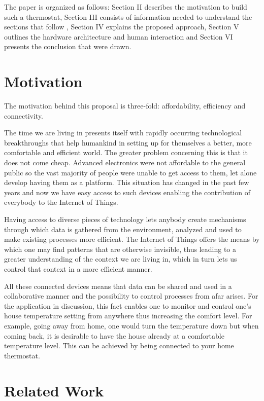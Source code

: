 \documentclass[conference]{IEEEtran}
\let\Oldsection\section
\renewcommand{\section}{\FloatBarrier\Oldsection}
\begin{document}
The paper is organized as follows: Section II describes the motivation to build such a thermostat, Section III
consists of information needed to understand the sections that follow , Section IV explains the proposed
approach, Section V outlines the hardware architecture and human interaction and Section VI presents the conclusion
that were drawn.

\section{Motivation}
\label{Motivation}

The motivation behind this proposal is three-fold: affordability, efficiency and connectivity.

The time we are living in presents itself with rapidly occurring technological breakthroughs that help
humankind in setting up for themselves a better, more comfortable and efficient world. The greater problem concerning
this is that it does not come cheap. Advanced electronics were not affordable to the general public so the vast
majority of people were unable to get access to them, let alone develop  having them as a platform. This
situation has changed in the past few years and now we have easy access to such devices enabling the
contribution of everybody to the Internet of Things.

Having access to diverse pieces of technology lets anybody create mechanisms through which data is gathered
from the environment, analyzed and used to make existing processes more efficient. The Internet of Things
offers the means by which one may find patterns that are otherwise invisible, thus leading to a greater
understanding of the context we are living in, which in turn lets us control that context in a more efficient
manner.

All these connected devices means that data can be shared and used in a collaborative manner and the
possibility to control processes from afar arises. For the application in discussion, this fact enables one to
monitor and control one's house temperature setting from anywhere thus increasing the comfort level. For
example, going away from home, one would turn the temperature down but when coming back, it is desirable to
have the house already at a comfortable temperature level. This can be achieved by being connected to your
home thermostat.

\section{Related Work}
\label{Related Work}
\end{document}
